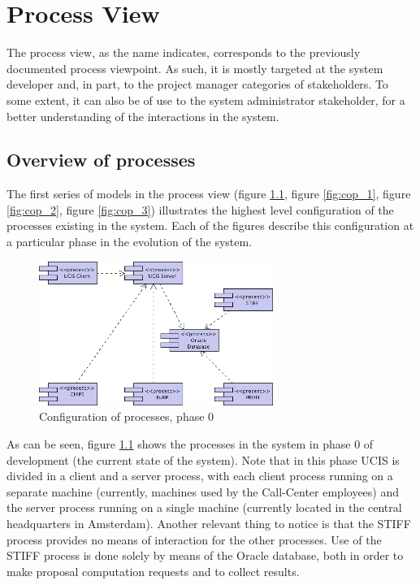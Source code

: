 \chapter{Process View}

The process view, as the name indicates, corresponds to the previously documented
process viewpoint. As such, it is mostly targeted at the system developer and, in part,
to the project manager categories of stakeholders. To some extent, it can also be of
use to the system administrator stakeholder, for a better understanding of the
interactions in the system.

\section{Overview of processes}

The first series of models in the process view (figure \ref{fig:cop_0}, figure \ref{fig:cop_1},
figure \ref{fig:cop_2}, figure \ref{fig:cop_3}) illustrates the highest level configuration
of the processes existing in the system. Each of the figures describe this configuration
at a particular phase in the evolution of the system.

\begin{figure}[ht]
\begin{center}
\includegraphics[width=3in]{img/cop_0.png}
\end{center}
\caption{Configuration of processes, phase 0}
\label{fig:cop_0}
\end{figure}

As can be seen, figure \ref{fig:cop_0} shows the processes in the system in phase 0 of
development (the current state of the system). Note that in this phase UCIS is divided
in a client and a server process, with each client process running on a separate machine
(currently, machines used by the Call-Center employees) and the server process running
on a single machine (currently located in the central headquarters in Amsterdam).
Another relevant thing to notice is that the STIFF process provides no means of interaction
for the other processes. Use of the STIFF process is done solely by means of the Oracle
database, both in order to make proposal computation requests and to collect results.

